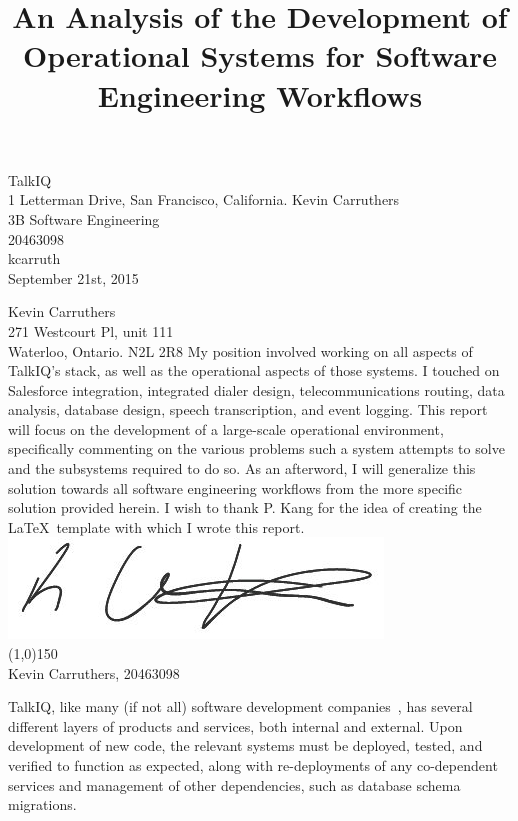 \documentclass[12pt]{article}
\begin{document}
\title{An Analysis of the Development of Operational Systems for Software Engineering Workflows}
{
    TalkIQ\\
    1 Letterman Drive, San Francisco, California.
}
{
    Kevin Carruthers\\
    3B Software Engineering\\
    20463098\\
    kcarruth\\
    September 21st, 2015
}


{
    \noindent
    Kevin Carruthers\\
    271 Westcourt Pl, unit 111\\
    Waterloo, Ontario. N2L 2R8
}
{
    My position involved working on all aspects of TalkIQ's stack, as well as the operational aspects of those systems. I touched on Salesforce integration, integrated dialer design, telecommunications routing, data analysis, database design, speech transcription, and event logging.
}
{
    This report will focus on the development of a large-scale operational environment, specifically commenting on the various problems such a system attempts to solve and the subsystems required to do so. As an afterword, I will generalize this solution towards all software engineering workflows from the more specific solution provided herein.
}
{
    I wish to thank P. Kang for the idea of creating the \LaTeX\ template with which I wrote this report.
}
{
    \includegraphics[scale=0.5]{signature.jpg}\\
    \line(1,0){150}\\
    Kevin Carruthers, 20463098
}


TalkIQ, like many (if not all) software development companies~\cite{component}, has several different layers of products and services, both internal and external. Upon development of new code, the relevant systems must be deployed, tested, and verified to function as expected, along with re-deployments of any co-dependent services and management of other dependencies, such as database schema migrations.
\end{document}
